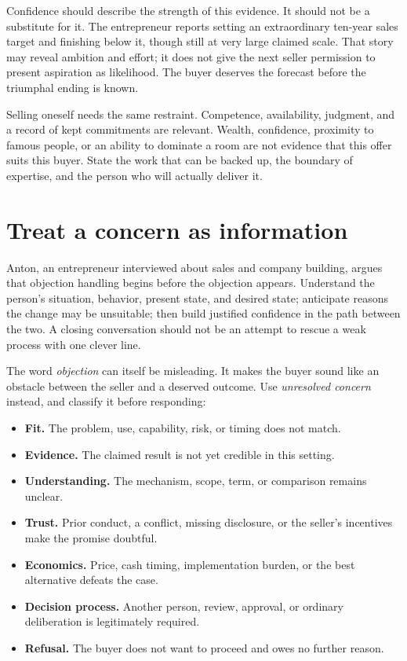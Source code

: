 Confidence should describe the strength of this evidence. It should not be a
substitute for it. The entrepreneur reports setting an extraordinary ten-year
sales target and finishing below it, though still at very large claimed scale.
That story may reveal ambition and effort; it does not give the next seller
permission to present aspiration as likelihood. The buyer deserves the
forecast before the triumphal ending is known.

Selling oneself needs the same restraint. Competence, availability, judgment,
and a record of kept commitments are relevant. Wealth, confidence, proximity
to famous people, or an ability to dominate a room are not evidence that this
offer suits this buyer. State the work that can be backed up, the boundary of
expertise, and the person who will actually deliver it.

\section{Treat a concern as information}

Anton, an entrepreneur interviewed about sales and company building, argues
that objection handling begins before the objection appears. Understand the
person's situation, behavior, present state, and desired state; anticipate
reasons the change may be unsuitable; then build justified confidence in the
path between the two. A closing conversation should not be an attempt to rescue
a weak process with one clever line.

The word \emph{objection} can itself be misleading. It makes the buyer sound
like an obstacle between the seller and a deserved outcome. Use
\emph{unresolved concern} instead, and classify it before responding:

\begin{itemize}[leftmargin=1.5em,itemsep=0.15em]
\item \textbf{Fit.} The problem, use, capability, risk, or timing does not match.
\item \textbf{Evidence.} The claimed result is not yet credible in this setting.
\item \textbf{Understanding.} The mechanism, scope, term, or comparison remains
  unclear.
\item \textbf{Trust.} Prior conduct, a conflict, missing disclosure, or the
  seller's incentives make the promise doubtful.
\item \textbf{Economics.} Price, cash timing, implementation burden, or the best
  alternative defeats the case.
\item \textbf{Decision process.} Another person, review, approval, or ordinary
  deliberation is legitimately required.
\item \textbf{Refusal.} The buyer does not want to proceed and owes no further
  reason.
\end{itemize}

